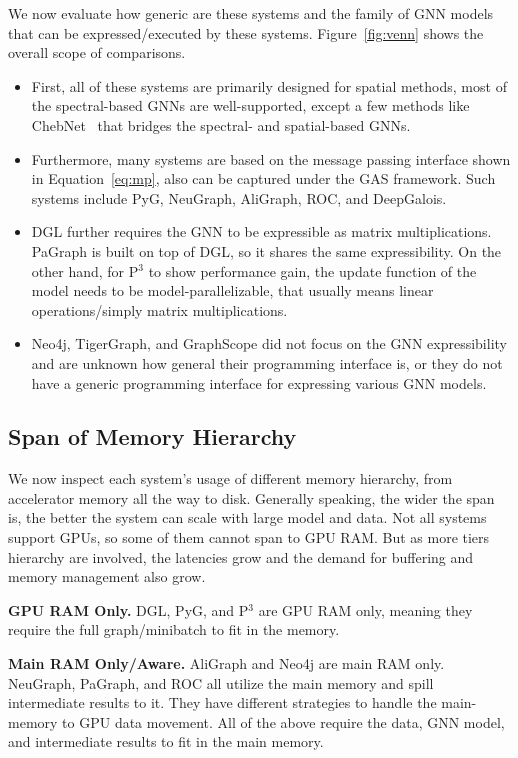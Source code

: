 We now evaluate how generic are these systems and the family of GNN models that can be expressed/executed by these systems. Figure~\ref{fig:venn} shows the overall scope of comparisons. 
\begin{itemize}
\item First, all of these systems are primarily designed for spatial methods, most of the spectral-based GNNs are well-supported, except a few methods like ChebNet~\cite{chebnet} that bridges the spectral- and spatial-based GNNs. 
\item Furthermore, many systems are based on the message passing interface shown in Equation~\ref{eq:mp}, also can be captured under the GAS framework. Such systems include PyG, NeuGraph, AliGraph, ROC, and DeepGalois.
\item DGL further requires the GNN to be expressible as matrix multiplications. PaGraph is built on top of DGL, so it shares the same expressibility. On the other hand, for P$^{3}$ to show performance gain, the update function of the model needs to be model-parallelizable, that usually means linear operations/simply matrix multiplications.
\item Neo4j, TigerGraph, and GraphScope did not focus on the GNN expressibility and are unknown how general their programming interface is, or they do not have a generic programming interface for expressing various GNN models. 
\end{itemize}

\subsection{Span of Memory Hierarchy}
We now inspect each system's usage of different memory hierarchy, from accelerator memory all the way to disk. Generally speaking, the wider the span is, the better the system can scale with large model and data. Not all systems support GPUs, so some of them cannot span to GPU RAM. But as more tiers hierarchy are involved, the latencies grow and the demand for buffering and memory management also grow.

\vspace{2mm}
\noindent \textbf{GPU RAM Only.} DGL, PyG, and P$^{3}$ are GPU RAM only, meaning they require the full graph/minibatch to fit in the memory.


\vspace{2mm}
\noindent \textbf{Main RAM Only/Aware.} AliGraph and Neo4j are main RAM only. NeuGraph, PaGraph, and ROC all utilize the main memory and spill intermediate results to it. They have different strategies to handle the main-memory to GPU data movement. All of the above require the data, GNN model, and intermediate results to fit in the main memory.

